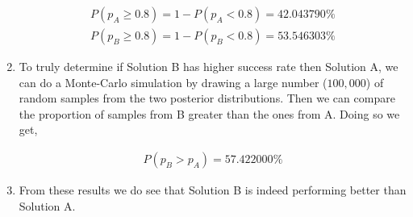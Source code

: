 \documentclass{article}
\begin{document}
\begin{enumerate}
\begin{eqnarray*}
P(p_A \ge 0.8) = 1 - P(p_A < 0.8) = 42.043790 \%\\
P(p_B \ge 0.8) = 1 - P(p_B < 0.8) = 53.546303 \%
\end{eqnarray*}

\item To truly determine if Solution B has higher success rate then Solution A, we can do a Monte-Carlo simulation
by drawing a large number ($100,000$) of random samples from the two posterior distributions. Then we can compare the proportion of samples from B greater than the ones from A. Doing so we get,

\begin{eqnarray*}
P(p_B > p_A) =  57.422000\%
\end{eqnarray*}

\item From these results we do see that Solution B is indeed performing better than Solution A. 

\end{enumerate}

\\

\end{document}
